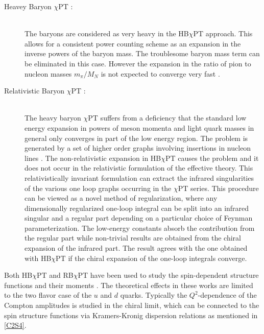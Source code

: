 \begin{description}
\item[Heavey Baryon $\chi$PT :] \hfill \\
The baryons are considered as very heavy in the HB$\chi$PT approach. This allows for a consistent power counting scheme as an expansion in the inverse powers of the baryon mass. The troublesome baryon mass term can be eliminated in this case. However the expansion in the ratio of pion to nucleon masses $m_\pi/M_N$ is not expected to converge very fast \cite{Bernard1993}.
\item[Relativistic Baryon $\chi$PT :] \hfill \\
The heavy baryon $\chi$PT suffers from a deficiency that the standard low energy expansion in powers of meson momenta and light quark masses in general only converges in part of the low energy region. The problem is generated by a set of higher order graphs involving insertions in nucleon lines \cite{Becher1999}. The non-relativistic expansion in HB$\chi$PT causes the problem and it does not occur in the relativistic formulation of the effective theory. This relativistically invariant formulation can extract the infrared singularities of the various one loop graphs occurring in the $\chi$PT series. This procedure can be viewed as a novel method of regularization, where any dimensionally regularized one-loop integral can be split into an infrared singular and a regular part depending on a particular choice of Feynman parameterization. The low-energy constants absorb the contribution from the regular part while non-trivial results are obtained from the chiral expansion of the infrared part. The result agrees with the one obtained with HB$\chi$PT if the chiral expansion of the one-loop integrals converge.
\end{description}

Both HB$\chi$PT and RB$\chi$PT have been used to study the spin-dependent structure functions and their moments \cite{Ji2000,Bernard2002,Kao2003,Bernard2003}. The theoretical effects in these works are limited to the two flavor case of the $u$ and $d$ quarks. Typically the $Q^2$-dependence of the Compton amplitudes is studied in the chiral limit, which can be connected to the spin structure functions via Kramers-Kronig dispersion relations as mentioned in \cref{C2S4}.

